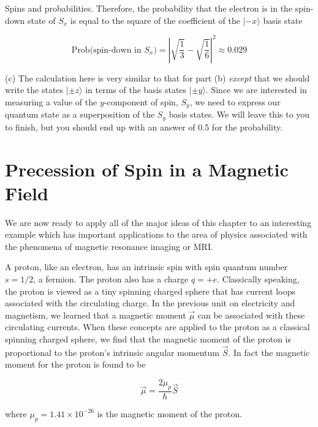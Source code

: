 \begin{example}{Spins and probabilities.}
Therefore, the probability that the electron is in the spin-down state of $S_x$ is equal to the square of the coefficient of the $|\mbox{$-x$}\rangle$ basis state

\begin{equation}
\mbox{Prob}\bigl(\mbox{spin-down in $S_x$}\bigr) = \left|\sqrt{\frac{1}{3}} - \sqrt{\frac{1}{6}}\right|^2 \approx 0.029
\end{equation} 

(c) The calculation here is very similar to that for part (b) {\em except} that we should write the states $|\mbox{$\pm z$}\rangle$ in terms of the basis states $|\mbox{$\pm y$}\rangle$.  Since we are interested in measuring a value of the $y$-component of spin, $S_y$, we need to express our quantum state as a superposition of the $S_y$ basis states.  We will leave this to you to finish, but you should end up with an answer of 0.5 for the probability.
\end{example}

\section{Precession of Spin in a Magnetic Field}

We are now ready to apply all of the major ideas of this chapter to an interesting example which has important applications to the area of physics associated with the phenomena of magnetic resonance imaging or MRI.

A proton, like an electron, has an intrinsic spin with spin quantum number $s = 1/2$, a fermion.  The proton also has a charge $q = + e$.  Classically speaking, the proton is viewed as a tiny spinning charged sphere that has current loops associated with the circulating charge.  In the previous unit on electricity and magnetism, we learned that a magnetic moment $\vec{\mu}$ can be associated with these circulating currents.  When these concepts are applied to the proton as a classical spinning charged sphere, we find that the magnetic moment of the proton is proportional to the proton's intrinsic angular momentum $\vec{S}$.  In fact the magnetic moment for the proton is found to be

\begin{equation}
\vec{\mu} = \frac{2 \mu_p}{\hbar} \vec{S}
\label{eq:magMoment}
\end{equation}

\noindent where $\mu_p = 1.41 \times 10^{-26}$  is the magnetic moment of the proton.

